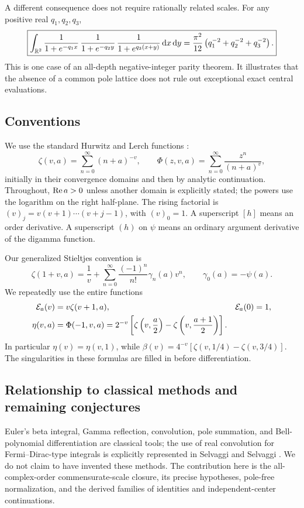 A different consequence does not require rationally related scales.
For any positive real $q_1,q_2,q_3$,
\begin{equation}\label{clc:eq:intro-cubic}
 \boxed{\displaystyle
 \int_{\mathbb R^2}
 \frac{1}{1+e^{-q_1x}}\,
 \frac{1}{1+e^{-q_2y}}\,
 \frac{1}{1+e^{q_3(x+y)}}\,\mathrm d x\,\mathrm d y
 =\frac{\pi^2}{12}\left(q_1^{-2}+q_2^{-2}+q_3^{-2}\right).}
\end{equation}
This is one case of an all-depth negative-integer parity theorem. It
illustrates that the absence of a common pole lattice does not rule out
exceptional exact central evaluations.

\subsection{Conventions}
We use the standard Hurwitz and Lerch functions \cite{DLMF25}:
\[
 \zeta(v,a)=\sum_{n=0}^\infty(n+a)^{-v},\qquad
 \Phi(z,v,a)=\sum_{n=0}^\infty\frac{z^n}{(n+a)^v},
\]
initially in their convergence domains and then by analytic continuation.
Throughout, $\operatorname{Re} a>0$ unless another domain is explicitly stated; the
powers use the logarithm on the right half-plane. The rising factorial is
$(v)_j=v(v+1)\cdots(v+j-1)$, with $(v)_0=1$. A superscript $[h]$ means
an order derivative. A superscript $(h)$ on $\psi$ means an ordinary
argument derivative of the digamma function.

Our generalized Stieltjes convention is
\begin{equation}\label{clc:eq:stieltjes-convention}
 \zeta(1+v,a)=\frac1v+
 \sum_{n=0}^\infty\frac{(-1)^n}{n!}\gamma_n(a)v^n,
 \qquad \gamma_0(a)=-\psi(a).
\end{equation}
We repeatedly use the entire functions
\begin{align}
 \mathcal E_a(v)&=v\zeta(v+1,a),&\mathcal E_a(0)&=1,\label{clc:eq:E}\\
 \eta(v,a)&=\Phi(-1,v,a)
 =2^{-v}\left[\zeta\left(v,\frac a2\right)
                  -\zeta\left(v,\frac{a+1}2\right)\right].
 \label{clc:eq:eta}
\end{align}
In particular $\eta(v)=\eta(v,1)$, while
$\beta(v)=4^{-v}[\zeta(v,1/4)-\zeta(v,3/4)]$.
The singularities in these formulas are filled in before differentiation.

\subsection{Relationship to classical methods and remaining conjectures}
Euler's beta integral, Gamma reflection, convolution, pole summation,
and Bell-polynomial differentiation are classical tools; the use of real
convolution for Fermi--Dirac-type integrals is explicitly represented in
Selvaggi and Selvaggi \cite{SS}. We do not claim to have invented these
methods. The contribution here is the all-complex-order commensurate-scale
closure, its precise hypotheses, pole-free normalization, and the derived
families of identities and independent-center continuations.

